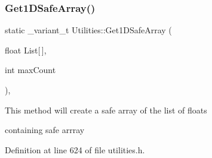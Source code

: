 \subsubsection{\texorpdfstring{Get1\+D\+Safe\+Array()}{Get1DSafeArray()}\hspace{0.1cm}{\footnotesize\ttfamily [2/2]}}
{\footnotesize\ttfamily static \+\_\+variant\+\_\+t Utilities\+::\+Get1\+D\+Safe\+Array (\begin{DoxyParamCaption}\item[{float}]{List\mbox{[}$\,$\mbox{]},  }\item[{int}]{max\+Count }\end{DoxyParamCaption})\hspace{0.3cm}{\ttfamily [inline]}, {\ttfamily [static]}}

This method will create a safe array of the list of floats

containing safe arrray 

Definition at line 624 of file utilities.\+h.


